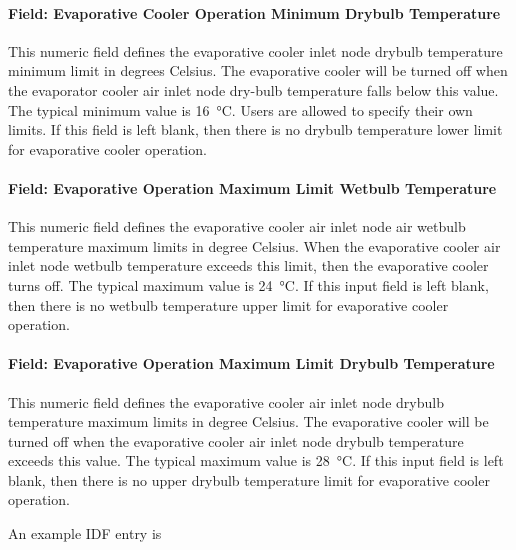 \paragraph{Field: Evaporative Cooler Operation Minimum Drybulb Temperature}\label{field-evaporative-cooler-operation-minimum-drybulb-temperature}

This numeric field defines the evaporative cooler inlet node drybulb temperature minimum limit in degrees Celsius. The evaporative cooler will be turned off when the evaporator cooler air inlet node dry-bulb temperature falls below this value. The typical minimum value is \SI{16}{\celsius}. Users are allowed to specify their own limits. If this field is left blank, then there is no drybulb temperature lower limit for evaporative cooler operation.

\paragraph{Field: Evaporative Operation Maximum Limit Wetbulb Temperature}\label{field-evaporative-operation-maximum-limit-wetbulb-temperature}

This numeric field defines the evaporative cooler air inlet node air wetbulb temperature maximum limits in degree Celsius. When the evaporative cooler air inlet node wetbulb temperature exceeds this limit, then the evaporative cooler turns off. The typical maximum value is \SI{24}{\celsius}. If this input field is left blank, then there is no wetbulb temperature upper limit for evaporative cooler operation.

\paragraph{Field: Evaporative Operation Maximum Limit Drybulb Temperature}\label{field-evaporative-operation-maximum-limit-drybulb-temperature}

This numeric field defines the evaporative cooler air inlet node drybulb temperature maximum limits in degree Celsius. The evaporative cooler will be turned off when the evaporative cooler air inlet node drybulb temperature exceeds this value. The typical maximum value is \SI{28}{\celsius}. If this input field is left blank, then there is no upper drybulb temperature limit for evaporative cooler operation.

An example IDF entry is

